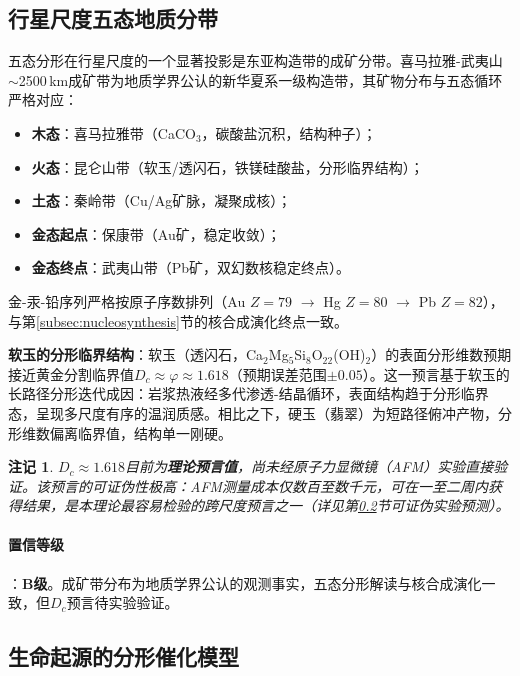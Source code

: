 \documentclass[12pt,a4paper,twocolumn]{article}
\renewcommand{\phi}{\varphi}
\newtheorem{remark}[theorem]{注记}
\begin{document}
\subsection{行星尺度五态地质分带}
\label{subsec:geological}

五态分形在行星尺度的一个显著投影是东亚构造带的成矿分带。喜马拉雅-武夷山$\sim$2500\,km成矿带为地质学界公认的新华夏系一级构造带，其矿物分布与五态循环严格对应：

\begin{itemize}
\item \textbf{木态}：喜马拉雅带（CaCO$_3$，碳酸盐沉积，结构种子）；
\item \textbf{火态}：昆仑山带（软玉/透闪石，铁镁硅酸盐，分形临界结构）；
\item \textbf{土态}：秦岭带（Cu/Ag矿脉，凝聚成核）；
\item \textbf{金态起点}：保康带（Au矿，稳定收敛）；
\item \textbf{金态终点}：武夷山带（Pb矿，双幻数核稳定终点）。
\end{itemize}

金-汞-铅序列严格按原子序数排列（Au $Z=79$ $\to$ Hg $Z=80$ $\to$ Pb $Z=82$），与第\ref{subsec:nucleosynthesis}节的核合成演化终点一致。

\textbf{软玉的分形临界结构}：软玉（透闪石，Ca$_2$Mg$_5$Si$_8$O$_{22}$(OH)$_2$）的表面分形维数预期接近黄金分割临界值$D_c \approx \phi \approx 1.618$（预期误差范围$\pm 0.05$）。这一预言基于软玉的长路径分形迭代成因：岩浆热液经多代渗透-结晶循环，表面结构趋于分形临界态，呈现多尺度有序的温润质感。相比之下，硬玉（翡翠）为短路径俯冲产物，分形维数偏离临界值，结构单一刚硬。

\begin{remark}
$D_c \approx 1.618$目前为\textbf{理论预言值}，尚未经原子力显微镜（AFM）实验直接验证。该预言的可证伪性极高：AFM测量成本仅数百至数千元，可在一至二周内获得结果，是本理论最容易检验的跨尺度预言之一（详见第\ref{subsec:life_origin}节可证伪实验预测）。
\end{remark}

\paragraph{置信等级}：\textbf{B级}。成矿带分布为地质学界公认的观测事实，五态分形解读与核合成演化一致，但$D_c$预言待实验验证。

\subsection{生命起源的分形催化模型}
\label{subsec:life_origin}
\end{document}
